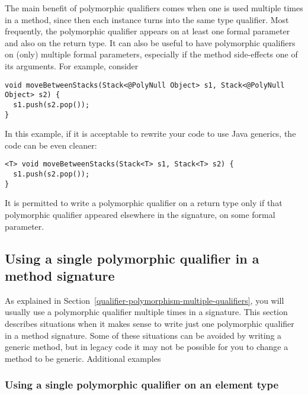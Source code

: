The main benefit of polymorphic qualifiers comes when one is used multiple times
in a method, since then each instance turns into the same type qualifier.
Most frequently, the polymorphic qualifier appears on at least one formal
parameter and also on the return type.  It can also be useful to have
polymorphic qualifiers on (only) multiple formal parameters, especially if
the method side-effects one of its arguments.
For example, consider

\begin{Verbatim}
void moveBetweenStacks(Stack<@PolyNull Object> s1, Stack<@PolyNull Object> s2) {
  s1.push(s2.pop());
}
\end{Verbatim}

\noindent
In this example, if it is acceptable to rewrite your code to use Java
generics, the code can be even cleaner:

\begin{Verbatim}
<T> void moveBetweenStacks(Stack<T> s1, Stack<T> s2) {
  s1.push(s2.pop());
}
\end{Verbatim}

\label{qualifier-polymorphism-return-type}
It is permitted to write a polymorphic qualifier on a return type only if
that polymorphic qualifier appeared elsewhere in the signature, on some
formal parameter.



\subsection{Using a single polymorphic qualifier in a method signature\label{qualifier-polymorphism-single-qualifier}}

As explained in Section~\ref{qualifier-polymorphism-multiple-qualifiers},
you will usually use a polymorphic qualifier
multiple times in a signature.
This section describes situations when it makes sense to write just one
polymorphic qualifier in a method signature.
Some of these situations can be avoided by writing a generic method,
but in legacy code it may not be possible for you to change a method to be
generic.
Additional examples 


\subsubsection{Using a single polymorphic qualifier on an element type\label{qualifier-polymorphism-element-types}}

